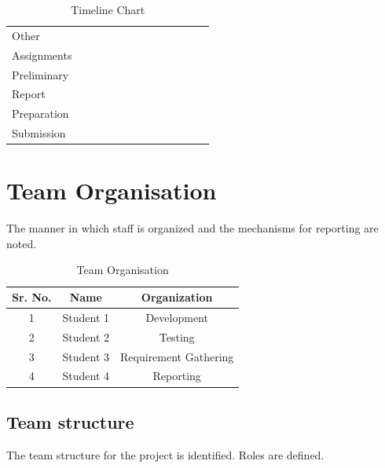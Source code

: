 \documentclass{report} %
\begin{document}
\begin{table}[H]
\begin{tabular}{|p{2cm}|c|c|c|c|c|c|c|c|c|c|c|c|}
					\hline
					Other & & & & & & & & \cellcolor{green} & \cellcolor{green} & & & \\
					Assignments & & & & & & & & \cellcolor{green} & \cellcolor{green} & & & \\
					\hline
					Preliminary & & & & & & & & & & \cellcolor{green} & \cellcolor{green} & \cellcolor{green}\\
					Report & & & & & & & & & & \cellcolor{green} & \cellcolor{green} & \cellcolor{green} \\
					Preparation & & & & & & & & & & \cellcolor{green} & \cellcolor{green} & \cellcolor{green} \\
					\hline
					Submission & & & & & & & & & & \cellcolor{green} & \cellcolor{green} & \cellcolor{green}\\
					\hline
				\end{tabular}
			\caption{Timeline Chart}
			\end{table}
			
		\section{Team Organisation}
		The manner in which staff is organized and the mechanisms for reporting are noted. \\
			
		\begin{table}[H]
			\centering
			\renewcommand{\arraystretch}{1.5}
			\begin{tabular}{|c|c|c|}
				\hline
				\textbf{Sr. No.} & \textbf{Name} & \textbf{Organization} \\
				\hline
				1 & Student 1 & Development \\
				\hline
				2 & Student 2 & Testing \\
				\hline
				3 & Student 3 & Requirement Gathering \\
				\hline
				4 & Student 4 & Reporting \\
				\hline
			\end{tabular}
			\caption{Team Organisation}
		\end{table}
				
			\subsection{Team structure}
			The team structure for the project is identified. Roles are defined. \\
			
\end{document}
